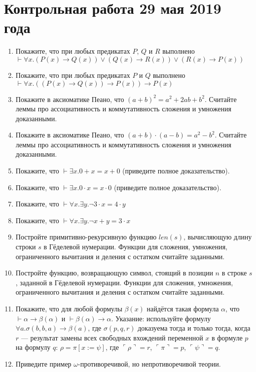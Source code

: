 \documentclass[10pt,a4paper,oneside]{article}
\begin{document}
\section*{Контрольная работа 29 мая 2019 года}
\begin{enumerate}
\item Покажите, что при любых предикатах $P$, $Q$ и $R$ выполнено
$\vdash \forall x.(P(x)\rightarrow Q(x))\vee(Q(x)\rightarrow R(x))\vee(R(x)\rightarrow P(x))$ 
\item Покажите, что при любых предикатах $P$ и $Q$ выполнено
$\vdash \forall x.((P(x)\rightarrow Q(x))\rightarrow P(x))\rightarrow P(x)$ 
\item Покажите в аксиоматике Пеано, что $(a+b)^2 = a^2 + 2ab +b^2$. Считайте леммы про ассоциативность и коммутативность
сложения и умножения доказанными.
\item Покажите в аксиоматике Пеано, что $(a+b)\cdot (a-b) = a^2 - b^2$. Считайте леммы про ассоциативность и коммутативность
сложения и умножения доказанными.
\item Покажите, что $\vdash \exists x.0+x=x+0$ (приведите полное доказательство).
\item Покажите, что $\vdash \exists x.0\cdot x=x \cdot 0$ (приведите полное доказательство).
\item Покажите, что $\vdash \forall x.\exists y.\neg 3\cdot x = 4\cdot y$ 
\item Покажите, что $\vdash \forall x.\exists y.\neg x + y = 3 \cdot x$ 
\item Постройте примитивно-рекурсивную функцию $len(s)$, вычисляющую длину строки $s$ в Гёделевой нумерации.
Функции для сложения, умножения, ограниченного вычитания и деления с остатком считайте заданными.
\item Постройте функцию, возвращающую символ, стоящий в позиции $n$ в строке $s$, заданной в Гёделевой нумерации.
Функции для сложения, умножения, ограниченного вычитания и деления с остатком считайте заданными.
\item Покажите, что для любой формулы $\beta(x)$ найдётся такая формула $\alpha$, 
что $\vdash\alpha\rightarrow\beta(\alpha)$ и $\vdash\beta(\alpha)\rightarrow\alpha$. Указание: 
используйте формулу $\forall a.\sigma(b,b,a)\rightarrow\beta(a)$,
где $\sigma(p,q,r)$ доказуема тогда и только тогда, когда $r$ --- результат замены всех свободных
вхождений переменной $x$ в формуле $p$ на формулу $q$: $\rho = \pi[x := \psi]$, где
$\ulcorner\rho\urcorner = r$, $\ulcorner\pi\urcorner = p$, $\ulcorner\psi\urcorner = q$.
\item Приведите пример $\omega$-противоречивой, но непротиворечивой теории.
\end{enumerate}
\end{document}
